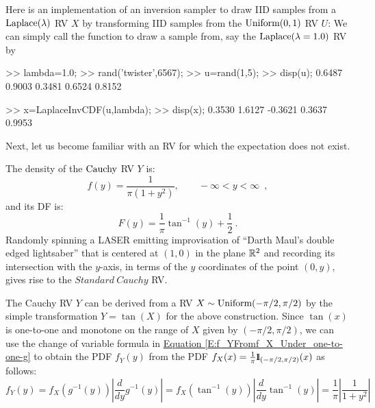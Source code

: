 \begin{simulation}[$\laplace(\lambda)$] \label{SIM:Laplace}
Here is an implementation of an inversion sampler to draw IID samples from a $\laplace(\lambda)$ RV $X$ by transforming IID samples from the $\mbox{{\rm Uniform}}(0,1)$ RV $U$:
We can simply call the function to draw a sample from, say the $\mbox{{\rm Laplace}}(\lambda=1.0)$ RV by
\begin{VrbM}
>> lambda=1.0;		%
>> rand('twister',6567);        %
>> u=rand(1,5);		%
>> disp(u);		%
    0.6487    0.9003    0.3481    0.6524    0.8152

>> x=LaplaceInvCDF(u,lambda); %
>> disp(x);                     %
    0.3530    1.6127   -0.3621    0.3637    0.9953
\end{VrbM}
\end{simulation}


Next, let us become familiar with an RV for which the expectation does not exist.  %
\begin{model}[$\cauchy$]
The density of the $\cauchy$ RV $Y$ is:
\begin{equation}\label{E:StandardCauchypdf}
f(y) = \frac{1}{\pi (1+y^2)}, \qquad -\infty < y < \infty \enspace ,
\end{equation}
and its DF is:
\begin{equation}\label{E:StandardCauchycdf}
F(y) = \frac{1}{\pi} \tan^{-1} (y) + \frac{1}{2} \ .
\end{equation}
Randomly spinning a LASER emitting improvisation of ``Darth Maul's double edged lightsaber'' that is centered at $(1,0)$ in the plane $\mathbb{R}^2$ and recording its intersection with the $y$-axis, in terms of the $y$ coordinates of the point $(0,y)$, gives rise to the $Standard~Cauchy$ RV.

The Cauchy RV $Y$ can be derived from a RV $X \sim \mbox{{\rm Uniform}}(-\pi/2,\pi/2)$ by the simple transformation $Y = \tan(X)$ for the above construction. 
Since $\tan(x)$ is one-to-one and monotone on the range of $X$ given by $(-\pi/2,\pi/2)$, 
we can use the change of variable formula in \hyperref[E:f_YFromf_X_Under_one-to-one-g]{Equation \ref*{E:f_YFromf_X_Under_one-to-one-g}} to obtain the PDF $f_Y(y)$ from the PDF $f_X(x)=\frac{1}{\pi}{1}\mspace{-11 mu}{1}_{(-\pi/2,\pi/2)}(x)$ as follows:
\[
f_Y(y) = f_X(g^{-1}(y)) \left| \frac{d}{dy} g^{-1}(y) \right| = f_X(\tan^{-1}(y)) \left| \frac{d}{dy} \tan^{-1}(y) \right| = \frac{1}{\pi} \left| \frac{1}{1+y^2} \right|
\]
\end{model}

